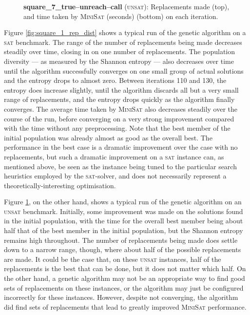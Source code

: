 \documentclass[proof,pdftex,11pt,a4,titlepage]{article}
\newcommand{\sat}{\textsc{sat}}
\newcommand{\unsat}{\textsc{unsat}}
\begin{document}
\begin{figure}[p]
  

  \vspace{1cm}

  
  \caption{{\bf square\_7\_true--unreach--call} (\unsat{}): Replacements made (top), and time taken by \textsc{MiniSat} (seconds) (bottom) on each iteration.}
  \label{fig:square_7_rep_dist}
\end{figure}

Figure \ref{fig:square_1_rep_dist} shows a typical run of the genetic algorithm on a \sat{} benchmark. The range of the number of replacements being made decreases steadily over time, closing in on one number of replacements. The population diversity --- as measured by the Shannon entropy --- also decreases over time until the algorithm successfully converges on one small group of actual solutions and the entropy drops to almost zero. Between iterations 110 and 130, the entropy does increase slightly, until the algorithm discards all but a very small range of replacements, and the entropy drops quickly as the algorithm finally converges. The average time taken by \textsc{MiniSat} also decreases steadily over the course of the run, before converging on a very strong improvement compared with the time without any preprocessing. Note that the best member of the initial population was already almost as good as the overall best. The performance in the best case is a dramatic improvement over the case with no replacements, but such a dramatic improvement on a \sat{} instance can, as mentioned above, be seen as the instance being tuned to the particular search heuristics employed by the \sat{}-solver, and does not necessarily represent a theoretically-interesting optimisation.

Figure \ref{fig:square_7_rep_dist}, on the other hand, shows a typical run of the genetic algorithm on an \unsat{} benchmark. Initially, some improvement was made on the solutions found in the initial population, with the time for the overall best member being about half that of the best member in the initial population, but the Shannon entropy remains high throughout. The number of replacements being made does settle down to a narrow range, though, where about half of the possible replacements are made. It could be the case that, on these \unsat{} instances, half of the replacements is the best that can be done, but it does not matter which half. On the other hand, a genetic algorithm may not be an appropriate way to find good sets of replacements on these instances, or the algorithm may just be configured incorrectly for these instances. However, despite not converging, the algorithm did find sets of replacements that lead to greatly improved \textsc{MiniSat} performance.
\end{document}
